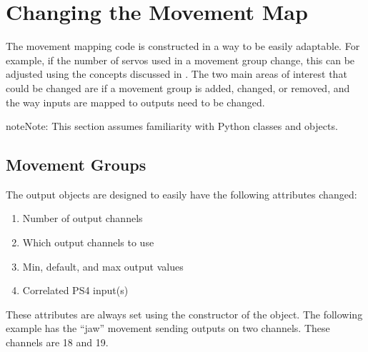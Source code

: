 \documentclass[letterpaper,10pt,english]{sphinxmanual}
\begin{document}
\section{Changing the Movement Map}
\label{\detokenize{mapchange:changing-the-movement-map}}\label{\detokenize{mapchange::doc}}
\sphinxAtStartPar
The movement mapping code is constructed in a way to be easily adaptable.
For example, if the number of servos used in a movement group change, this
can be adjusted using the concepts discussed in {\hyperref[\detokenize{range:pyrange}]{}}. The two
main areas of interest that could be changed are if a movement group is
added, changed, or removed, and the way inputs are mapped to outputs need
to be changed.

\begin{sphinxadmonition}{note}{Note:}
\sphinxAtStartPar
This section assumes familiarity with Python classes and objects.
\end{sphinxadmonition}


\subsection{Movement Groups}
\label{\detokenize{mapchange:movement-groups}}
\sphinxAtStartPar
The output objects are designed to easily have the following attributes
changed:
\begin{enumerate}
%
\item {} 
\sphinxAtStartPar
Number of output channels

\item {} 
\sphinxAtStartPar
Which output channels to use

\item {} 
\sphinxAtStartPar
Min, default, and max output values

\item {} 
\sphinxAtStartPar
Correlated PS4 input(s)

\end{enumerate}

\sphinxAtStartPar
{}

\sphinxAtStartPar
These attributes are always set using the constructor of the object.
The following example has the “jaw” movement sending outputs on two
channels. These channels are 18 and 19.

\begin{sphinxVerbatim}[commandchars=\\\{\}]
    \PYG{p}{[} \PYG{p}{]}
\end{sphinxVerbatim}
\end{document}
